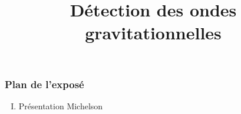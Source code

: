 \documentclass{beamer}
\title{Détection des ondes gravitationnelles}
\begin{document}
\begin{frame}
	\titlepage
\end{frame}

\begin{frame}
	\frametitle{Plan de l'exposé}
	\begin{enumerate}[I.]
		\item Présentation Michelson
	\end{enumerate}
\end{frame}



\end{document}
